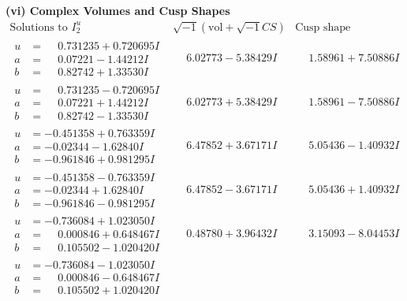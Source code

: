 \documentclass[1p]{elsarticle_modified}
\theoremstyle{definition}
\newcommand{\I}{\sqrt{-1}}
\begin{document}
\newpage\flushleft \textbf{(vi) Complex Volumes and Cusp Shapes}
$$\begin{array}{c|c|c}  
\text{Solutions to }I^u_{2}& \I (\text{vol} + \sqrt{-1}CS) & \text{Cusp shape}\\
 \hline 
\begin{aligned}
u &= \phantom{-}0.731235 + 0.720695 I \\
a &= \phantom{-}0.07221 - 1.44212 I \\
b &= \phantom{-}0.82742 + 1.33530 I\end{aligned}
 & \phantom{-}6.02773 - 5.38429 I & \phantom{-}1.58961 + 7.50886 I \\ \hline\begin{aligned}
u &= \phantom{-}0.731235 - 0.720695 I \\
a &= \phantom{-}0.07221 + 1.44212 I \\
b &= \phantom{-}0.82742 - 1.33530 I\end{aligned}
 & \phantom{-}6.02773 + 5.38429 I & \phantom{-}1.58961 - 7.50886 I \\ \hline\begin{aligned}
u &= -0.451358 + 0.763359 I \\
a &= -0.02344 - 1.62840 I \\
b &= -0.961846 + 0.981295 I\end{aligned}
 & \phantom{-}6.47852 + 3.67171 I & \phantom{-}5.05436 - 1.40932 I \\ \hline\begin{aligned}
u &= -0.451358 - 0.763359 I \\
a &= -0.02344 + 1.62840 I \\
b &= -0.961846 - 0.981295 I\end{aligned}
 & \phantom{-}6.47852 - 3.67171 I & \phantom{-}5.05436 + 1.40932 I \\ \hline\begin{aligned}
u &= -0.736084 + 1.023050 I \\
a &= \phantom{-}0.000846 + 0.648467 I \\
b &= \phantom{-}0.105502 - 1.020420 I\end{aligned}
 & \phantom{-}0.48780 + 3.96432 I & \phantom{-}3.15093 - 8.04453 I \\ \hline\begin{aligned}
u &= -0.736084 - 1.023050 I \\
a &= \phantom{-}0.000846 - 0.648467 I \\
b &= \phantom{-}0.105502 + 1.020420 I\end{aligned}

\end{array}$$
\end{document}
